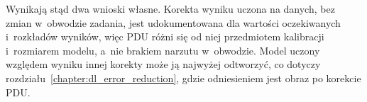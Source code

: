 Wynikają stąd dwa wnioski własne.
Korekta wyniku uczona na danych, bez zmian w~obwodzie zadania, jest udokumentowana dla wartości oczekiwanych i~rozkładów wyników, więc PDU różni się od niej przedmiotem kalibracji i~rozmiarem modelu, a~nie brakiem narzutu w~obwodzie.
Model uczony względem wyniku innej korekty może ją najwyżej odtworzyć, co dotyczy rozdziału~\ref{chapter:dl_error_reduction}, gdzie odniesieniem jest obraz po korekcie PDU.
